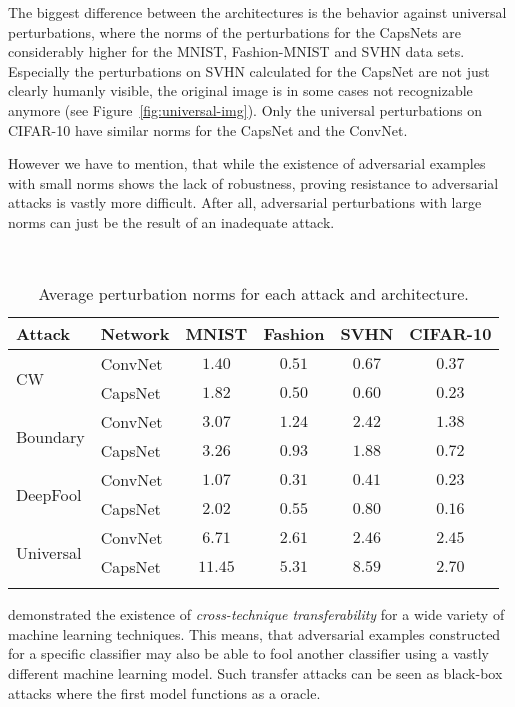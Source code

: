 The biggest difference between the architectures is the behavior against universal perturbations, where the norms of the perturbations for the CapsNets are considerably higher for the MNIST, Fashion-MNIST and SVHN data sets. Especially the perturbations on SVHN calculated for the CapsNet are not just clearly humanly visible, the original image is in some cases not recognizable anymore (see Figure~\ref{fig:universal-img}).
Only the universal perturbations on CIFAR-10 have similar norms for the CapsNet and the ConvNet.

However we have to mention, that while the existence of adversarial examples with small norms shows the lack of robustness, proving resistance to adversarial attacks is vastly more difficult.
After all, adversarial perturbations with large norms can just be the result of an inadequate attack.

\begin{table}
	\centering\
	\begin{tabular}{llcccc}
		\toprule
		Attack & Network       & MNIST & Fashion & SVHN & CIFAR-10  \\
		\midrule
		\multirow{2}{*}{CW} & ConvNet & {$1.40$} & $0.51$ & $0.67$ & $0.37$ \\
		& CapsNet            & $1.82$ & {$0.50$} & {$0.60$} & {$0.23$} \\
		\midrule
		\multirow{2}{*}{Boundary} & ConvNet & {$3.07$} & $1.24$ & $2.42$ & $1.38$ \\
		& CapsNet            & $3.26$ & {$0.93$} & {$1.88$} & {$0.72$} \\
		\midrule
		\multirow{2}{*}{DeepFool} & ConvNet & {$1.07$} & {$0.31$} & {$0.41$} & $0.23$ \\
		& CapsNet           & $2.02$ & $0.55$ & $0.80$ & {$0.16$} \\
		\midrule
		\multirow{2}{*}{Universal} & ConvNet & {$6.71$} & {$2.61$} & {$2.46$} & {$2.45$} \\
		& CapsNet           & $11.45$ & $5.31$ & $8.59$ & $2.70$ \\
		\bottomrule\\
	\end{tabular}
	\caption[Average Perturbation Norms]{Average perturbation norms for each attack and architecture.}
	\label{tab:norms}
\end{table}

\citet{transfer} demonstrated the existence of \emph{cross-technique transferability} for a wide variety of machine learning techniques. This means, that adversarial examples constructed for a specific classifier may also be able to fool another classifier using a vastly different machine learning model. Such transfer attacks can be seen as black-box attacks where the first model functions as a oracle.

